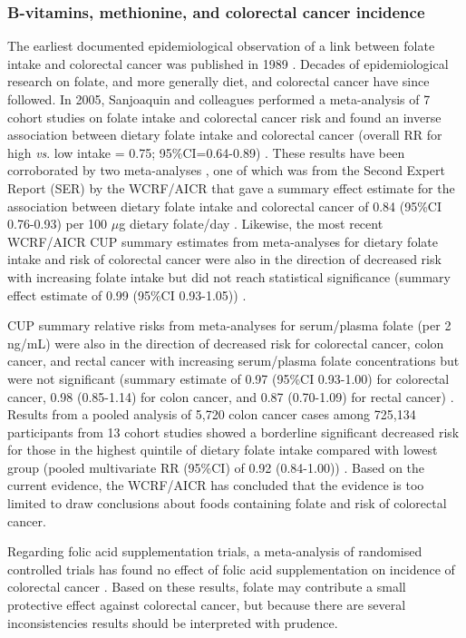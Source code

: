 \subsubsection{B-vitamins, methionine, and colorectal cancer incidence} %
\noindent The earliest documented epidemiological observation of a link between folate intake and colorectal cancer was published in 1989 \cite{c159}. Decades of epidemiological research on folate, and more generally diet, and colorectal cancer have since followed. In 2005, Sanjoaquin and colleagues performed a meta-analysis of 7 cohort studies on folate intake and colorectal cancer risk and found an inverse association between dietary folate intake and colorectal cancer (overall RR for high \textit{vs}. low intake = 0.75; 95\%CI=0.64-0.89) \cite{c160}. These results have been corroborated by two meta-analyses \cite{c126,c161}, one of which was from the Second Expert Report (SER) by the WCRF/AICR that gave a summary effect estimate for the association between dietary folate intake and colorectal cancer of 0.84 (95\%CI 0.76-0.93) per 100 $\mu$g dietary folate/day \cite{c126}. Likewise, the most recent WCRF/AICR CUP summary estimates from meta-analyses for dietary folate intake and risk of colorectal cancer were also in the direction of decreased risk with increasing folate intake but did not reach statistical significance (summary effect estimate of 0.99 (95\%CI 0.93-1.05)) \cite{c127}. 
 
\noindent CUP summary relative risks from meta-analyses for serum/plasma folate (per 2 ng/mL) were also in the direction of decreased risk for colorectal cancer, colon cancer, and rectal cancer with increasing serum/plasma folate concentrations but were not significant (summary estimate of 0.97 (95\%CI 0.93-1.00) for colorectal cancer, 0.98 (0.85-1.14) for colon cancer, and 0.87 (0.70-1.09) for rectal cancer) \cite{c127}. Results from a pooled analysis of 5,720 colon cancer cases among 725,134 participants from 13 cohort studies showed a borderline significant decreased risk for those in the highest quintile of dietary folate intake compared with lowest group (pooled multivariate RR (95\%CI) of 0.92 (0.84-1.00)) \cite{c162}. Based on the current evidence, the WCRF/AICR has concluded that the evidence is too limited to draw conclusions about foods containing folate and risk of colorectal cancer. 
 
\noindent Regarding folic acid supplementation trials, a meta-analysis of randomised controlled trials has found no effect of folic acid supplementation on incidence of colorectal cancer \cite{c163}. Based on these results, folate may contribute a small protective effect against colorectal cancer, but because there are several inconsistencies results should be interpreted with prudence. 
 
